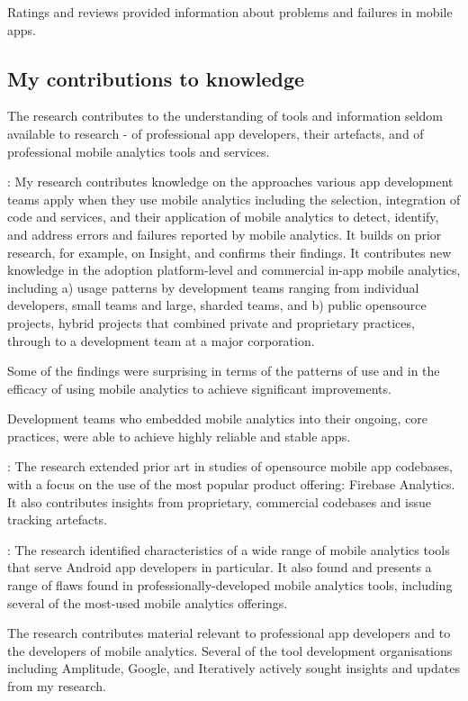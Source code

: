 Ratings and reviews provided information about problems and failures in mobile apps.

\subsection{My contributions to knowledge}
The research contributes to the understanding of tools and information seldom available to research - of professional app developers, their artefacts, and of professional mobile analytics tools and services. 

: 
My research contributes knowledge on the approaches various app development teams apply when they use mobile analytics including the selection, integration of code and services, and their application of mobile analytics to detect, identify, and address errors and failures reported by mobile analytics. It builds on prior research, for example, on Insight, and confirms their findings. It contributes new knowledge in the adoption platform-level and commercial in-app mobile analytics, including a) usage patterns by development teams ranging from individual  developers, small teams and large,  sharded teams, and b) public opensource projects, hybrid projects that combined private and proprietary practices, through to a development team at a major corporation.

Some of the findings were surprising in terms of the patterns of use and in the efficacy of using mobile analytics to achieve significant improvements.

Development teams who embedded mobile analytics into their ongoing, core practices, were able to achieve highly reliable and stable apps. 

: 
The research extended prior art in studies of opensource mobile app codebases, with a focus on the use of the most popular product offering: Firebase Analytics. It also contributes insights from proprietary, commercial codebases and issue tracking artefacts.

:
The research identified characteristics of a wide range of mobile analytics tools that serve Android app developers in particular. It also found and  presents a range of flaws found in professionally-developed mobile analytics tools, including several of the most-used mobile analytics offerings.

The research contributes material relevant to professional app developers and to the developers of mobile analytics. Several of the tool development organisations including Amplitude, Google, and Iteratively actively sought insights and updates from my research.

